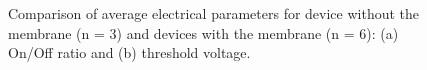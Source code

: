 \begin{figure}
    \centering
    \hfill
    \caption{Comparison of average electrical parameters for device without the membrane (n = 3) and devices with the membrane (n = 6): (a) On/Off ratio and (b) threshold voltage.}
    \label{fig:avgParamsCfr}
\end{figure}


